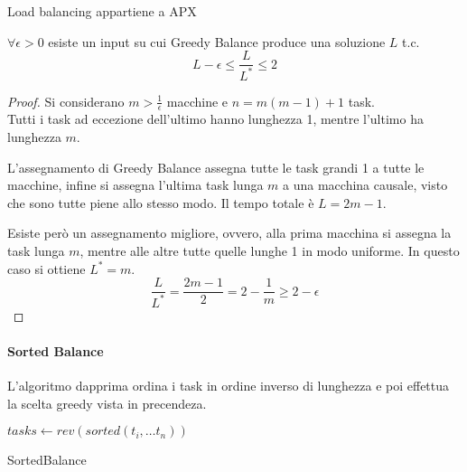 \begin{corollary}
    Load balancing appartiene a APX    
\end{corollary}
\begin{theorem}
    $\forall \epsilon > 0$ esiste un input su cui Greedy Balance produce una soluzione 
    $L$ t.c. $$L-\epsilon \leq \frac{L}{L^*}\leq2$$
\end{theorem}
\begin{proof}
    Si considerano $m > \frac{1}{\epsilon}$ macchine e $n = m(m-1) + 1$ task.\\
    Tutti i task ad eccezione dell'ultimo hanno lunghezza 1, mentre l'ultimo ha lunghezza $m$.

    L'assegnamento di Greedy Balance assegna tutte le task grandi 1 a tutte le macchine, 
    infine si assegna l'ultima task lunga $m$ a una macchina causale, visto che sono 
    tutte piene allo stesso modo. Il tempo totale è $L = 2m-1$.

    Esiste però un assegnamento migliore, ovvero, alla prima macchina si assegna la task lunga $m$, 
    mentre alle altre tutte quelle lunghe 1 in modo uniforme. In questo caso si ottiene
    $L^* = m$.
    $$\frac{L}{L^*} = \frac{2m-1}{2} = 2 - \frac{1}{m} \geq 2-\epsilon$$
\end{proof}

\paragraph{Sorted Balance}
L'algoritmo dapprima ordina i task in ordine inverso di lunghezza e poi effettua la scelta 
greedy vista in precendeza.

\begin{algorithm}[H]
    \SetAlgoLined
    $tasks \gets rev(sorted(t_i, \dots t_n))$\\
     \caption{SortedBalance}
\end{algorithm}

